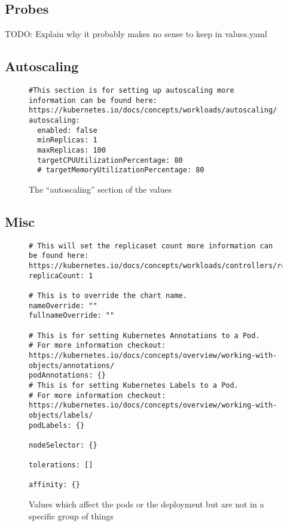 \documentclass[english,10pt]{scrbook}
\begin{document}
\subsection{Probes}

TODO: Explain why it probably makes no sense to keep in values.yaml

\lipsum[2-4] 
\clearpage

\subsection{Autoscaling}
\lipsum[2-4] 

\begin{figure}[h]
\begin{verbatim}
#This section is for setting up autoscaling more information can be found here: https://kubernetes.io/docs/concepts/workloads/autoscaling/
autoscaling:
  enabled: false
  minReplicas: 1
  maxReplicas: 100
  targetCPUUtilizationPercentage: 80
  # targetMemoryUtilizationPercentage: 80
\end{verbatim}
\caption{The \enquote{autoscaling} section of the \gls{values}}\label{code:autoscaling_section}
\end{figure}
\clearpage

\subsection{Misc}
\lipsum[2-4] 

\begin{figure}[h]
\begin{verbatim}
# This will set the replicaset count more information can be found here: https://kubernetes.io/docs/concepts/workloads/controllers/replicaset/
replicaCount: 1

# This is to override the chart name.
nameOverride: ""
fullnameOverride: ""

# This is for setting Kubernetes Annotations to a Pod.
# For more information checkout: https://kubernetes.io/docs/concepts/overview/working-with-objects/annotations/ 
podAnnotations: {}
# This is for setting Kubernetes Labels to a Pod.
# For more information checkout: https://kubernetes.io/docs/concepts/overview/working-with-objects/labels/
podLabels: {}

nodeSelector: {}

tolerations: []

affinity: {}
\end{verbatim}
\caption{Values which affect the pods or the deployment but are not in a specific group of things}\label{code:misc_values}
\end{figure}
\clearpage
\end{document}

